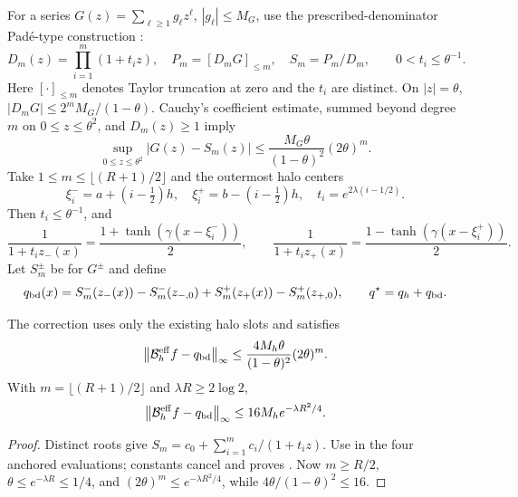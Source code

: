 For a series $G(z)=\sum_{\ell\ge1}g_\ell z^\ell$, $|g_\ell|\le M_G$,
use the prescribed-denominator Pad\'e-type construction
\cite{BrezinskiRedivoZaglia2015}:
\begin{equation}
 D_m(z)=\prod_{i=1}^m(1+t_i z),\quad
 P_m=[D_mG]_{\le m},\quad S_m=P_m/D_m,
 \qquad 0<t_i\le\theta^{-1}.
 \label{eq:pade}
\end{equation}
Here $[\cdot]_{\le m}$ denotes Taylor truncation at zero and the $t_i$ are
distinct. On $|z|=\theta$, $|D_mG|\le 2^mM_G/(1-\theta)$.
Cauchy's coefficient estimate, summed beyond degree $m$ on
$0\le z\le\theta^2$, and $D_m(z)\ge1$ imply
\begin{equation}
 \sup_{0\le z\le\theta^2}|G(z)-S_m(z)|
 \le \frac{M_G\theta}{(1-\theta)^2}(2\theta)^m.
 \label{eq:pade-error}
\end{equation}
Take $1\le m\le\lfloor(R+1)/2\rfloor$ and the outermost halo centers
\begin{equation}
 \xi_i^-=a+(i-\tfrac12)h,\quad
 \xi_i^+=b-(i-\tfrac12)h,\quad t_i=e^{2\lambda(i-1/2)}.
 \label{eq:outer-centers}
\end{equation}
Then $t_i\le\theta^{-1}$, and
\begin{equation}
 \frac1{1+t_i z_-(x)}=\frac{1+\tanh(\gamma(x-\xi_i^-))}{2},\qquad
 \frac1{1+t_i z_+(x)}=\frac{1-\tanh(\gamma(x-\xi_i^+))}{2}.
 \label{eq:halo-identity}
\end{equation}
Let $S_m^\pm$ be  for $G^\pm$ and define
\begin{equation}
 q_{\rm bd}(x)=S_m^-(z_-(x))-S_m^-(z_{-,0})
              +S_m^+(z_+(x))-S_m^+(z_{+,0}),
 \qquad q^\star=q_h+q_{\rm bd}.
 \label{eq:qbd}
\end{equation}

\begin{proposition}
\label{prop:boundary-correction}
The correction uses only the existing halo slots and satisfies
\begin{equation}
 \left\lVert \mathcal B_h^{\rm eff}f-q_{\rm bd}\right\rVert_\infty
 \le\frac{4M_h\theta}{(1-\theta)^2}(2\theta)^m.
 \label{eq:bd-general}
\end{equation}
With $m=\lfloor(R+1)/2\rfloor$ and $\lambda R\ge2\log2$,
\begin{equation}
 \left\lVert \mathcal B_h^{\rm eff}f-q_{\rm bd}\right\rVert_\infty
 \le16M_h e^{-\lambda R^2/4}.
 \label{eq:bd-r2}
\end{equation}
\end{proposition}
\begin{proof}
Distinct roots give $S_m=c_0+\sum_{i=1}^m c_i/(1+t_i z)$.
Use  in the four anchored evaluations; constants
cancel and  proves .
Now $m\ge R/2$, $\theta\le e^{-\lambda R}\le1/4$, and
$(2\theta)^m\le e^{-\lambda R^2/4}$, while
$4\theta/(1-\theta)^2\le16$.
\end{proof}

